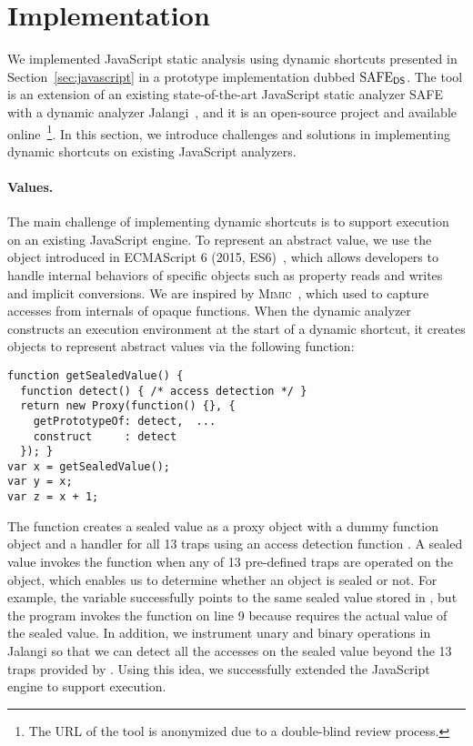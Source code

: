 \section{Implementation}\label{sec:implementation}
We implemented JavaScript static analysis using dynamic shortcuts
presented in Section~\ref{sec:javascript} in a prototype implementation dubbed
$\text{SAFE}_{\textsf{DS}}$.  The tool is an extension of an existing state-of-the-art JavaScript
static analyzer SAFE~\cite{safe, safe2} with a dynamic analyzer
Jalangi~\cite{jalangi}, and it is an open-source project and available online~\footnote{The
URL of the tool is anonymized due to a double-blind review process.}.  In this
section, we introduce challenges and solutions in implementing dynamic
shortcuts on existing JavaScript analyzers.

\paragraph{{\SealeD} Values.}
The main challenge of implementing dynamic shortcuts is to support {\sealed} execution on an existing JavaScript engine.  To represent an abstract
value, we use the  object introduced in ECMAScript 6
(2015, ES6)~\cite{es6}, which allows developers to handle internal behaviors
of specific objects such as property reads and writes and implicit conversions.
We are inspired by \textsc{Mimic}~\cite{mimic}, which used  to
capture accesses from internals of opaque functions.  When the dynamic analyzer
constructs an execution environment at the start of a dynamic shortcut, it
creates  objects to represent abstract values via the
following  function:
\begin{lstlisting}[style=myJSstyle]
function getSealedValue() {
  function detect() { /* access detection */ }
  return new Proxy(function() {}, {
    getPrototypeOf: detect,  ...
    construct     : detect
  }); }
var x = getSealedValue();
var y = x;
var z = x + 1;
\end{lstlisting}
The function creates a sealed value as a proxy object with a dummy
function object and a handler for all 13 traps using an access detection
function .  A sealed value invokes the function 
when any of 13 pre-defined traps are operated on the object, which enables us to
determine whether an object is sealed or not.  For example, the variable
 successfully points to the same sealed value stored in , but the
program invokes the function  on line 9 because  requires
the actual value of the sealed value.  In addition, we instrument unary and binary
operations in Jalangi so that we can detect all the accesses on the
sealed value beyond the 13 traps provided by .
Using this idea, we successfully extended the
JavaScript engine to support {\sealed} execution.

